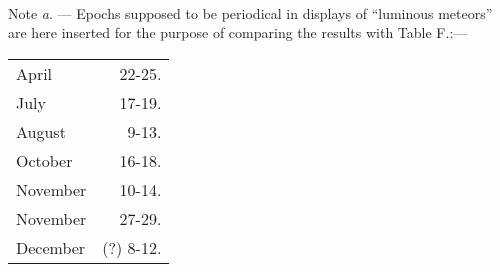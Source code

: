 \documentclass[a4paper, 12pt, oneside]{article}
\begin{document}
\paragraph{}
Note \emph{a}. --- Epochs supposed to be periodical in displays of ``luminous meteors'' are here inserted for the purpose of comparing the results with Table F.:---
\begin{table}[H]
    \centering
    \begin{tabular}{l r}
        April & 22-25. \\
        July & 17-19. \\
        August & 9-13. \\
        October & 16-18. \\
        November & 10-14. \\
        November & 27-29. \\
        December & (?) 8-12. \\
    \end{tabular}
\end{table}
\end{document}

